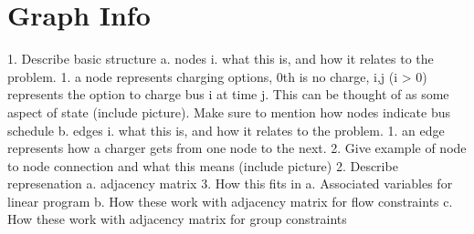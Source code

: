 \section{Graph Info}
1. Describe basic structure
    a. nodes
        i. what this is, and how it relates to the problem.  
	    1. a node represents charging options, 0th is no charge, i,j (i > 0) represents the option to charge bus i at time j.  This can be thought of as some aspect of state (include picture).  Make sure to mention how nodes indicate bus schedule
    b. edges
        i. what this is, and how it relates to the problem.
	    1. an edge represents how a charger gets from one node to the next.  
	    2. Give example of node to node connection and what this means (include picture)
2. Describe represenation
    a. adjacency matrix
3. How this fits in
    a. Associated variables for linear program
    b. How these work with adjacency matrix for flow constraints
    c. How these work with adjacency matrix for group constraints





